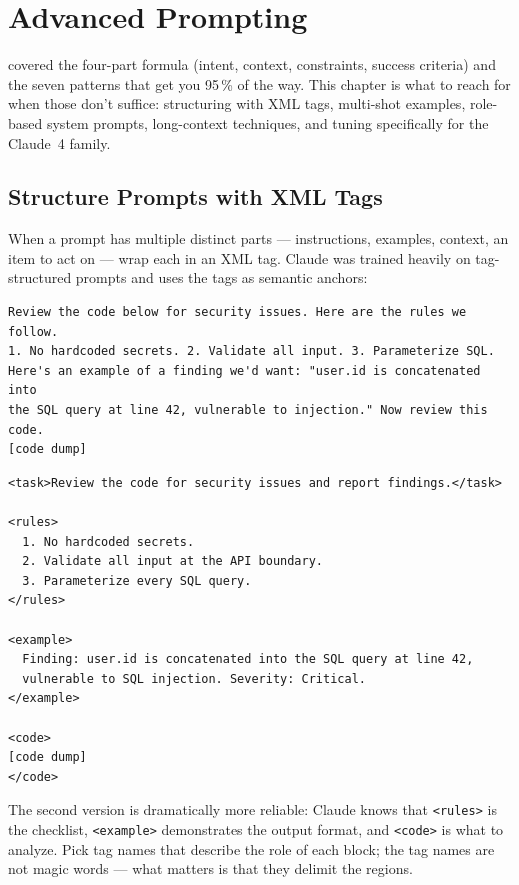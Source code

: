 \chapter{Advanced Prompting}
\label{ch:advanced-prompting}


 covered the four-part formula (intent, context,
constraints, success criteria) and the seven patterns that get you 95\,\%
of the way. This chapter is what to reach for when those don't suffice:
structuring with XML tags, multi-shot examples, role-based system prompts,
long-context techniques, and tuning specifically for the Claude~4 family.

\section{Structure Prompts with XML Tags}
\label{sec:xml-tags}


When a prompt has multiple distinct parts — instructions, examples,
context, an item to act on — wrap each in an XML tag. Claude was trained
heavily on tag-structured prompts and uses the tags as semantic anchors:

\begin{lstlisting}[caption={A prompt without XML — Claude has to guess what is what}]
Review the code below for security issues. Here are the rules we follow.
1. No hardcoded secrets. 2. Validate all input. 3. Parameterize SQL.
Here's an example of a finding we'd want: "user.id is concatenated into
the SQL query at line 42, vulnerable to injection." Now review this code.
[code dump]
\end{lstlisting}

\begin{lstlisting}[caption={The same prompt with XML structure}]
<task>Review the code for security issues and report findings.</task>

<rules>
  1. No hardcoded secrets.
  2. Validate all input at the API boundary.
  3. Parameterize every SQL query.
</rules>

<example>
  Finding: user.id is concatenated into the SQL query at line 42,
  vulnerable to SQL injection. Severity: Critical.
</example>

<code>
[code dump]
</code>
\end{lstlisting}

The second version is dramatically more reliable: Claude knows that
\texttt{<rules>} is the checklist, \texttt{<example>} demonstrates the
output format, and \texttt{<code>} is what to analyze. Pick tag names that
describe the role of each block; the tag names are not magic words — what
matters is that they delimit the regions.

